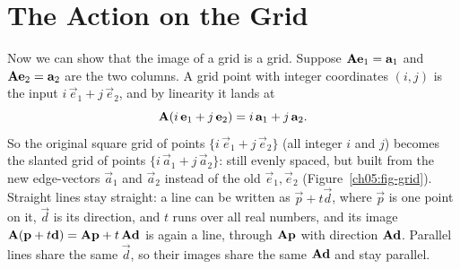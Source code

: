 \section{The Action on the Grid}
\label{ch05:grid}

Now we can show that the image of a grid is a grid. Suppose
$\mathbf{A}\mathbf{e}_1 = \mathbf{a}_1$ and $\mathbf{A}\mathbf{e}_2 = \mathbf{a}_2$ are the two
columns. A grid point with integer coordinates $(i,j)$ is the input
$i\,\vec{e}_1 + j\,\vec{e}_2$, and by linearity it lands at
\[
  \mathbf{A}(i\,\mathbf{e}_1 + j\,\mathbf{e}_2) = i\,\mathbf{a}_1 + j\,\mathbf{a}_2.
\]
So the original square grid of points $\{i\,\vec{e}_1 + j\,\vec{e}_2\}$ (all
integer $i$ and $j$) becomes the slanted grid of points
$\{i\,\vec{a}_1 + j\,\vec{a}_2\}$: still evenly spaced, but
built from the new edge-vectors $\vec{a}_1$ and $\vec{a}_2$ instead of
the old $\vec{e}_1, \vec{e}_2$ (Figure~\ref{ch05:fig-grid}). Straight lines stay
straight: a line can be written as $\vec{p} + t\vec{d}$, where $\vec{p}$ is one
point on it, $\vec{d}$ is its direction, and $t$ runs over all real numbers, and
its image $\mathbf{A}(\mathbf{p}+t\mathbf{d}) = \mathbf{A}\mathbf{p} + t\,\mathbf{A}\mathbf{d}$ is again
a line, through $\mathbf{A}\mathbf{p}$ with direction $\mathbf{A}\mathbf{d}$. Parallel lines
share the same $\vec{d}$, so their images share the same $\mathbf{A}\mathbf{d}$ and stay
parallel.

